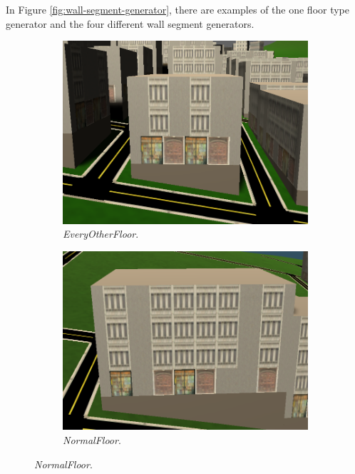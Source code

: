 In Figure \ref{fig:wall-segment-generator}, there are examples of the one floor type generator and the four different wall segment generators.

\begin{figure}[H]
  \centering

  \begin{subfigure}[b]{0.25\textwidth}
    \includegraphics[width=\textwidth]{figure/building-every-other.PNG}
    \caption{\textit{EveryOtherFloor}.}
  \end{subfigure}
  \quad
  \begin{subfigure}[b]{0.25\textwidth}
    \includegraphics[width=\textwidth]{figure/building-normal.PNG}
    \caption{\textit{NormalFloor}.}
  \end{subfigure}

\end{figure}
